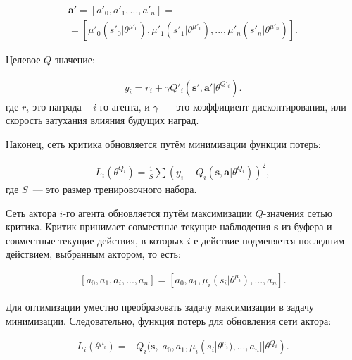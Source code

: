 \begin{equation}
    \begin{multlined}
        \mathbf{a'} = [a'_0, a'_1, ..., a'_n] = \\
        = [\mu'_0(s'_0|\theta^{\mu'_0}), \mu'_1(s'_1|\theta^{\mu'_1}), ..., \mu'_n(s'_n|\theta^{\mu'_n})].
    \end{multlined}
\end{equation}

Целевое $Q$-значение:

\begin{equation}
    \begin{multlined}
        y_i = r_i + \gamma Q'_i(\mathbf{s', a'}|\theta^{Q'_i}).
    \end{multlined}
\end{equation}
где $r_i$ это награда – $i$-го агента, и $\gamma$~--- это коэффициент дисконтирования, или скорость затухания влияния будущих наград.

Наконец, сеть критика обновляется путём минимизации функции потерь:

\begin{equation}
    \begin{multlined}
        L_i(\theta^{Q_i}) = \frac{1}{S} \sum (y_i - Q_i(\mathbf{s, a}|\theta^{Q_i}))^2,
    \end{multlined}
\end{equation}
где $S$~--- это размер тренировочного набора.

Сеть актора $i$-го агента обновляется путём максимизации $Q$-значения сетью критика. Критик принимает совместные текущие наблюдения \textbf{s} из буфера и совместные текущие действия, в которых $i$-е действие подменяется последним действием, выбранным актором, то есть:

\begin{equation}
    \begin{multlined}
    [a_0, a_1, a_i, ..., a_n]
        = [a_0, a_1, \mu_i(s_i|\theta^{\mu_i}), ..., a_n].
    \end{multlined}
\end{equation}

Для оптимизации уместно преобразовать задачу максимизации в задачу минимизации. Следовательно, функция потерь для обновления сети актора:

\begin{equation}
    \begin{multlined}
        L_i(\theta^{\mu_i}) = -Q_i(\mathbf{s}, [a_0, a_1, \mu_i(s_i|\theta^{\mu_i}), ..., a_n]|\theta^{Q_i}).
    \end{multlined}
\end{equation}

